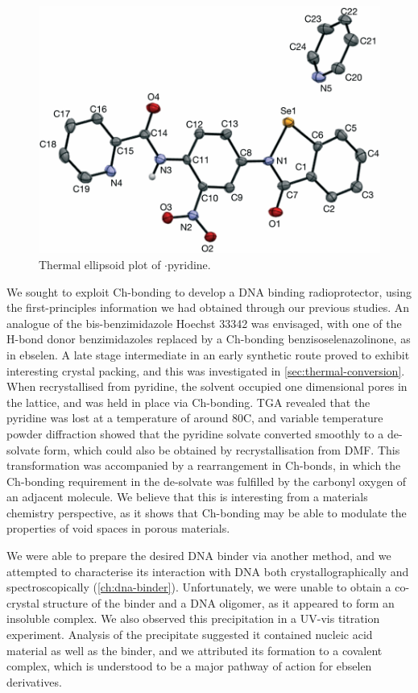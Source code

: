 \begin{refsection}
\begin{figure}
    \centering
    \includegraphics[width=0.8\linewidth]{Figures/ebs-nitroamide-2py-py-xtal.pdf}
    \caption{Thermal ellipsoid plot of $\cdot$pyridine.}
\end{figure}

We sought to exploit Ch-bonding to develop a DNA binding radioprotector, using the first-principles information we had obtained through our previous studies.
An analogue of the bis-benzimidazole Hoechst 33342 was envisaged, with one of the H-bond donor benzimidazoles replaced by a Ch-bonding benzisoselenazolinone, as in ebselen.
A late stage intermediate in an early synthetic route proved to exhibit interesting crystal packing, and this was investigated in \cref{sec:thermal-conversion}.
When recrystallised from pyridine, the solvent occupied one dimensional pores in the lattice, and was held in place via Ch-bonding.
TGA revealed that the pyridine was lost at a temperature of around 80\degree{}C, and variable temperature powder diffraction showed that the pyridine solvate converted smoothly to a de-solvate form, which could also be obtained by recrystallisation from DMF.
This transformation was accompanied by a rearrangement in Ch-bonds, in which the Ch-bonding requirement in the de-solvate was fulfilled by the carbonyl oxygen of an adjacent molecule.
We believe that this is interesting from a materials chemistry perspective, as it shows that Ch-bonding may be able to modulate the properties of void spaces in porous materials.

We were able to prepare the desired DNA binder via another method, and we attempted to characterise its interaction with DNA both crystallographically and spectroscopically (\cref{ch:dna-binder}).
Unfortunately, we were unable to obtain a co-crystal structure of the binder and a DNA oligomer, as it appeared to form an insoluble complex.
We also observed this precipitation in a UV-vis titration experiment.
Analysis of the precipitate suggested it contained nucleic acid material as well as the binder, and we attributed its formation to a covalent complex, which is understood to be a major pathway of action for ebselen derivatives.


\end{refsection}
